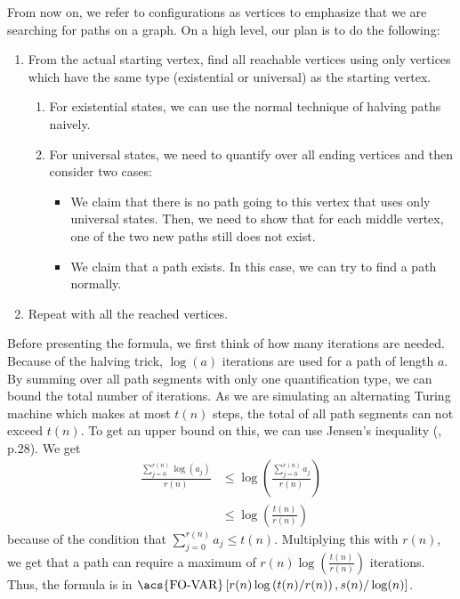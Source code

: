 From now on, we refer to configurations as vertices to emphasize that we are searching for paths on a graph.
On a high level, our plan is to do the following:
\begin{enumerate}
    \setlength\itemsep{0.15em}
    \item From the actual starting vertex, find all reachable vertices using only vertices which have the same type (existential or universal) as the starting vertex.
    \begin{enumerate}
        \item For existential states, we can use the normal technique of halving paths naively.
        \item For universal states, we need to quantify over all ending vertices and then consider two cases:
        \begin{itemize}
            \item We claim that there is no path going to this vertex that uses only universal states.
            Then, we need to show that for each middle vertex, one of the two new paths still does not exist.
            \item We claim that a path exists.
            In this case, we can try to find a path normally.
        \end{itemize}
    \end{enumerate}
    \item Repeat with all the reached vertices.
\end{enumerate}

Before presenting the formula, we first think of how many iterations are needed.
Because of the halving trick,  $\log(a)$ iterations are used for a path of length $a$.
By summing over all path segments with only one quantification type, we can bound the total number of iterations.
As we are simulating an alternating Turing machine which makes at most $t(n)$ steps, the total of all path segments can not exceed $t(n)$.
To get an upper bound on this, we can use Jensen's inequality (\cite{inequalities-math-oly}, p.28).
We get
\[
    \begin{aligned}
        \frac{\sum_{j = 0}^{r(n)}\log(a_{j})}{r(n)} &\leq \log\left(\frac{\sum_{j= 0}^{r(n)}a_{j}}{r(n)} \right)  \\
        &\leq \log\left(\frac{t(n)}{r(n)} \right)
    \end{aligned}
\]
because of the condition that $\sum_{j= 0}^{r(n)}a_{j} \leq t(n)$.
Multiplying this with $r(n)$, we get that a path can require a maximum of $r(n)\log\left(\frac{t(n)}{r(n)} \right)$ iterations.
Thus, the formula is in ${\text{\acs{FO-VAR}}\left[r(n)\log\left(t(n)/r(n) \right), s(n)/\log(n) \right]}$.


